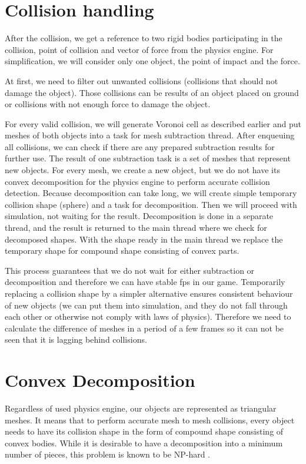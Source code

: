 \section{Collision handling}
\label{sec:collisions}
After the collision, we get a reference to two rigid bodies participating in the collision, point of collision and vector of force from the physics engine. For simplification, we will consider only one object, the point of impact and the force.

At first, we need to filter out unwanted collisions (collisions that should not damage the object). Those collisions can be results of an object placed on ground or collisions with not enough force to damage the object. 

For every valid collision, we will generate Voronoi cell as described earlier and put meshes of both objects into a task for mesh subtraction thread. After enqueuing all collisions, we can check if there are any prepared subtraction results for further use. The result of one subtraction task is a set of meshes that represent new objects. For every mesh, we create a new object, but we do not have its convex decomposition for the physics engine to perform accurate collision detection. Because decomposition can take long, we will create simple temporary collision shape (\eg sphere) and a task for decomposition. Then we will proceed with simulation, not waiting for the result. Decomposition is done in a separate thread, and the result is returned to the main thread where we check for decomposed shapes. With the shape ready in the main thread we replace the temporary shape for compound shape consisting of convex parts.

This process guarantees that we do not wait for either subtraction or decomposition and therefore we can have stable fps in our game. Temporarily replacing a collision shape by a simpler alternative ensures consistent behaviour of new objects (we can put them into simulation, and they do not fall through each other or otherwise not comply with laws of physics). Therefore we need to calculate the difference of meshes in a period of a few frames so it can not be seen that it is lagging behind collisions.

\section{Convex Decomposition}
\label{sec:decomposition}
Regardless of used physics engine, our objects are represented as triangular meshes. It means that to perform accurate mesh to mesh collisions, every object needs to have its collision shape in the form of compound shape consisting of convex bodies. While it is desirable to have a decomposition into a minimum number of pieces, this problem is known to be NP-hard \cite{convexDecomp}. 

